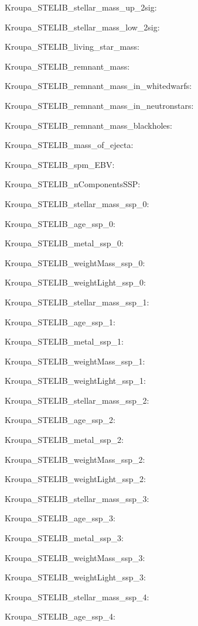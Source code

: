 \item Kroupa\_STELIB\_stellar\_mass\_up\_2sig: 
\item Kroupa\_STELIB\_stellar\_mass\_low\_2sig: 
\item Kroupa\_STELIB\_living\_star\_mass: 
\item Kroupa\_STELIB\_remnant\_mass: 
\item Kroupa\_STELIB\_remnant\_mass\_in\_whitedwarfs: 
\item Kroupa\_STELIB\_remnant\_mass\_in\_neutronstars: 
\item Kroupa\_STELIB\_remnant\_mass\_blackholes: 
\item Kroupa\_STELIB\_mass\_of\_ejecta: 
\item Kroupa\_STELIB\_spm\_EBV: 
\item Kroupa\_STELIB\_nComponentsSSP: 
\item Kroupa\_STELIB\_stellar\_mass\_ssp\_0: 
\item Kroupa\_STELIB\_age\_ssp\_0: 
\item Kroupa\_STELIB\_metal\_ssp\_0: 
\item Kroupa\_STELIB\_weightMass\_ssp\_0: 
\item Kroupa\_STELIB\_weightLight\_ssp\_0: 
\item Kroupa\_STELIB\_stellar\_mass\_ssp\_1: 
\item Kroupa\_STELIB\_age\_ssp\_1: 
\item Kroupa\_STELIB\_metal\_ssp\_1: 
\item Kroupa\_STELIB\_weightMass\_ssp\_1: 
\item Kroupa\_STELIB\_weightLight\_ssp\_1: 
\item Kroupa\_STELIB\_stellar\_mass\_ssp\_2: 
\item Kroupa\_STELIB\_age\_ssp\_2: 
\item Kroupa\_STELIB\_metal\_ssp\_2: 
\item Kroupa\_STELIB\_weightMass\_ssp\_2: 
\item Kroupa\_STELIB\_weightLight\_ssp\_2: 
\item Kroupa\_STELIB\_stellar\_mass\_ssp\_3: 
\item Kroupa\_STELIB\_age\_ssp\_3: 
\item Kroupa\_STELIB\_metal\_ssp\_3: 
\item Kroupa\_STELIB\_weightMass\_ssp\_3: 
\item Kroupa\_STELIB\_weightLight\_ssp\_3: 
\item Kroupa\_STELIB\_stellar\_mass\_ssp\_4: 
\item Kroupa\_STELIB\_age\_ssp\_4: 
